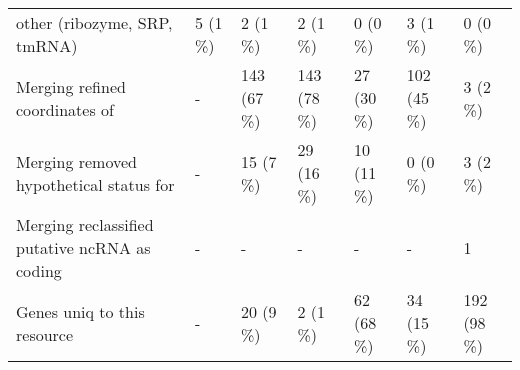 {\begin{tabular}{lllllll}
\hspace{1em}other (ribozyme, SRP, tmRNA) & 5 (1 \%) & 2 (1 \%) & 2 (1 \%) & 0 (0 \%) & 3 (1 \%) & 0 (0 \%)\\
\hspace{1em}Merging refined coordinates of & - & 143 (67 \%) & 143 (78 \%) & 27 (30 \%) & 102 (45 \%) & 3 (2 \%)\\
Merging removed hypothetical status for & - & 15 (7 \%) & 29 (16 \%) & 10 (11 \%) & 0 (0 \%) & 3 (2 \%)\\
Merging reclassified putative ncRNA as coding & - & - & - & - & - & 1\\
Genes uniq to this resource & - & 20 (9 \%) & 2 (1 \%) & 62 (68 \%) & 34 (15 \%) & 192 (98 \%)\\
\bottomrule
\end{tabular}}
